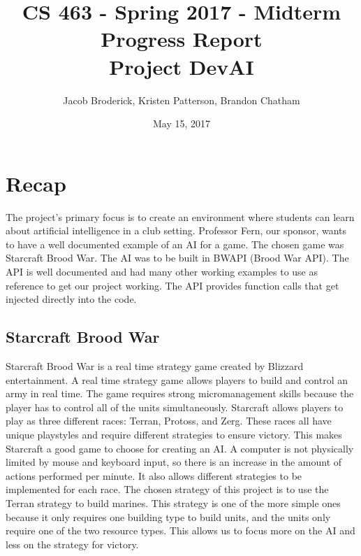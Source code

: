 \documentclass[10pt,letterpaper,onecolumn,draftclsnofoot]{IEEEtran}
\begin{document}
	
	\begin{titlepage}
		
		\title{CS 463 - Spring 2017 - Midterm Progress Report \\ Project DevAI}
		\author{Jacob Broderick, Kristen Patterson, Brandon Chatham}
		\date{May 15, 2017}
		\maketitle
		\vspace{4cm}
	\end{titlepage}

\section{Recap}
The project's primary focus is to create an environment where students can learn about artificial intelligence in a club setting. Professor Fern, our sponsor, wants to have a well documented example of an AI for a game. The chosen game was Starcraft Brood War. The AI was to be built in BWAPI (Brood War API). The API is well documented and had many other working examples to use as reference to get our project working. The API provides function calls that get injected directly into the code.

\subsection{Starcraft Brood War}
Starcraft Brood War is a real time strategy game created by Blizzard entertainment. A real time strategy game allows players to build and control an army in real time. The game requires strong micromanagement skills because the player has to control all of the units simultaneously. Starcraft allows players to play as three different races: Terran, Protoss, and Zerg. These races all have unique playstyles and require different strategies to ensure victory. This makes Starcraft a good game to choose for creating an AI. A computer is not physically limited by mouse and keyboard input, so there is an increase in the amount of actions performed per minute. It also allows different strategies to be implemented for each race. The chosen strategy of this project is to use the Terran strategy to build marines. This strategy is one of the more simple ones because it only requires one building type to build units, and the units only require one of the two resource types. This allows us to focus more on the AI and less on the strategy for victory.
\end{document}
